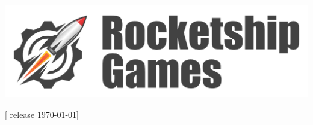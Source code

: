 \documentclass{tokh}
\begin{document}
\squelchbackground

\pagebreak
\restorebackground

\setcounter{tocdepth}{0}
\noindent
\begin{minipage}{\linewidth}
\fontsize{18}{18}\neuropolitical    
\tableofcontents
\end{minipage}

\bigskip
\vfill


\vfill

\centerline{\includegraphics[width=6in]{art/rocketshipgames-title-doublerow.pdf}}

\vfill
\hfill{\small[ release \today ]}

\thispagestyle{empty}
\clearpage


















\end{document}
